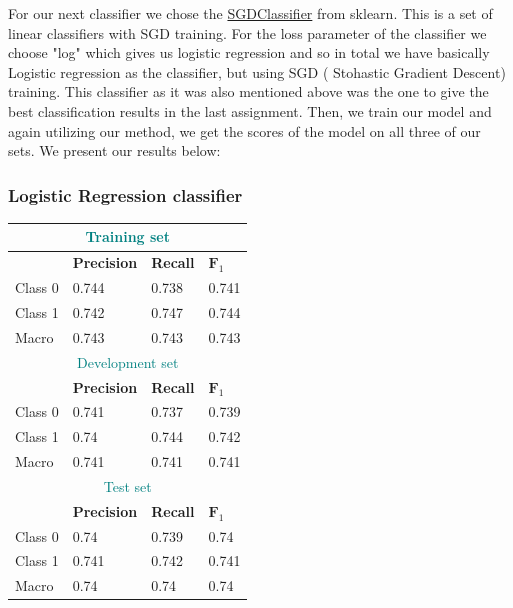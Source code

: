 \documentclass[10pt]{article}
\begin{document}
For our next classifier we chose the \href{https://scikit-learn.org/stable/modules/generated/sklearn.linear_model.SGDClassifier.html}{SGDClassifier} from sklearn. This is a set of linear classifiers with SGD training. For the loss parameter of the classifier we choose "log" which gives us logistic regression and so in total we have basically Logistic regression as the classifier, but using SGD ( Stohastic Gradient Descent) training. This classifier as it was also mentioned above was the one to give the best classification results in the last assignment. Then, we train our model and again utilizing our method, we get the scores of the model on all three of our sets. We present our results below:

\subsubsection*{Logistic Regression classifier}
\begin{tabular}{ |p{2cm}||p{3cm}|p{3cm}|p{3cm}|  }
 \hline
 \multicolumn{4}{|c|}{\textcolor{teal}{Training set}} \\
 \hline
  & \textbf{Precision} &  \textbf{Recall} & $\textbf{F}_1$\\
 \hline
 Class 0 & 0.744 & 0.738 & 0.741 \\
 Class 1 & 0.742 &  0.747 & 0.744 \\  \hline
 Macro & 0.743 & 0.743 & 0.743 \\
 \hline
  \hline
  
   \multicolumn{4}{|c|}{\textcolor{teal}{Development set}} \\
 \hline
  & \textbf{Precision} &  \textbf{Recall} & $\textbf{F}_1$\\
 \hline
 Class 0 & 0.741 & 0.737 & 0.739 \\
 Class 1 & 0.74 & 0.744 & 0.742 \\  \hline
 Macro & 0.741 & 0.741 & 0.741\\
 \hline
  \hline

  \multicolumn{4}{|c|}{\textcolor{teal}{Test set}} \\
 \hline
  & \textbf{Precision} &  \textbf{Recall} & $\textbf{F}_1$\\
 \hline
 Class 0 & 0.74 & 0.739 & 0.74 \\
 Class 1 & 0.741 & 0.742 & 0.741\\  \hline
 Macro & 0.74&  0.74 & 0.74\\
 \hline
 \hline
\end{tabular}
\bigskip
\end{document}
